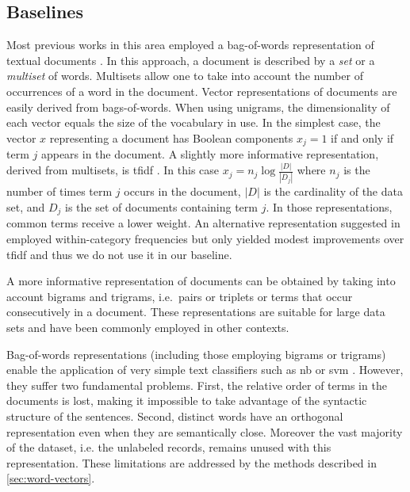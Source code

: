 \subsection{Baselines}
\label{sec-baselines}
Most previous works in this area employed a bag-of-words
representation of textual documents
\cite{manning_introduction_2008}. In this approach, a document is 
described by a \textit{set} or a \textit{multiset} of words.
Multisets allow one to take into account the number of occurrences of
a word in the document. Vector representations of documents are easily
derived from bags-of-words. When using unigrams, the dimensionality of
each vector equals the size of the vocabulary in use. In the simplest
case, the vector $x$ representing a document has Boolean components
$x_j=1$ if and only if term $j$ appears in the document. A slightly more
informative representation, derived from multisets, is \ac{tfidf}
\cite{manning_introduction_2008}. In this case 
$x_j=n_j\log \frac{|D|}{|D_j|}$ where $n_j$ is the number of times
term $j$ occurs in the document, $|D|$ is the cardinality of the
data set, and $D_j$ is the set of documents containing term $j$. In
those representations, common terms receive a lower weight. An
alternative representation suggested in
\cite{martinez_information_2011} employed within-category frequencies
but only yielded modest improvements over \ac{tfidf} and thus we do not
use it in our baseline.

A more informative representation of documents can be obtained by
taking into account bigrams and trigrams, i.e.\ pairs or triplets or
terms that occur consecutively in a document. These representations
are suitable for large data sets and have been commonly employed in
other contexts.

Bag-of-words representations (including those employing bigrams or
trigrams) enable the application of very simple text classifiers such
as \ac{nb} or \ac{svm} \cite{cortes-support-1995}. However, they
suffer two fundamental problems. First, the relative order of terms in
the documents is lost, making it impossible to take advantage of the
syntactic structure of the sentences. Second, distinct words have an
orthogonal representation even when they are semantically
close. Moreover the vast majority of the dataset, i.e. the unlabeled
records, remains unused with
this representation. These
limitations are addressed by the methods described in
\cref{sec:word-vectors}.

